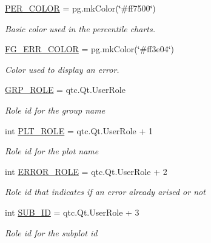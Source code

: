 \begin{DoxyCompactItemize}
\hyperlink{classDQN-Deepmind-NIPS-2013_1_1Plotter_1_1Plotter_aa599f9c39b850680c4842b8a53268882}{P\+E\+R\+\_\+\+C\+O\+L\+OR} = pg.\+mk\+Color(\char`\"{}\#ff7500\char`\"{})
\begin{DoxyCompactList}\small\item\em Basic color used in the percentile charts. \end{DoxyCompactList}\item 
\hyperlink{classDQN-Deepmind-NIPS-2013_1_1Plotter_1_1Plotter_aa272066f3775c7e5a00e58664498b545}{F\+G\+\_\+\+E\+R\+R\+\_\+\+C\+O\+L\+OR} = pg.\+mk\+Color(\char`\"{}\#ff3e04\char`\"{})
\begin{DoxyCompactList}\small\item\em Color used to display an error. \end{DoxyCompactList}\item 
\hyperlink{classDQN-Deepmind-NIPS-2013_1_1Plotter_1_1Plotter_a49bdb6a37de2bcff4d702417c64105ff}{G\+R\+P\+\_\+\+R\+O\+LE} = qtc.\+Qt.\+User\+Role
\begin{DoxyCompactList}\small\item\em \textquotesingle{}Role\textquotesingle{} id for the group name \end{DoxyCompactList}\item 
int \hyperlink{classDQN-Deepmind-NIPS-2013_1_1Plotter_1_1Plotter_aaedbcbba023e3d7730beb86579ec7efe}{P\+L\+T\+\_\+\+R\+O\+LE} = qtc.\+Qt.\+User\+Role + 1
\begin{DoxyCompactList}\small\item\em \textquotesingle{}Role\textquotesingle{} id for the plot name \end{DoxyCompactList}\item 
int \hyperlink{classDQN-Deepmind-NIPS-2013_1_1Plotter_1_1Plotter_ae72b47c3cf2965e2aca86ee30256edea}{E\+R\+R\+O\+R\+\_\+\+R\+O\+LE} = qtc.\+Qt.\+User\+Role + 2
\begin{DoxyCompactList}\small\item\em \textquotesingle{}Role\textquotesingle{} id that indicates if an error already arised or not \end{DoxyCompactList}\item 
int \hyperlink{classDQN-Deepmind-NIPS-2013_1_1Plotter_1_1Plotter_a7f8f653368bc22c7e80147b1d8dc5f18}{S\+U\+B\+\_\+\+ID} = qtc.\+Qt.\+User\+Role + 3
\begin{DoxyCompactList}\small\item\em \textquotesingle{}Role\textquotesingle{} id for the subplot id \end{DoxyCompactList}\item 

\end{DoxyCompactItemize}
